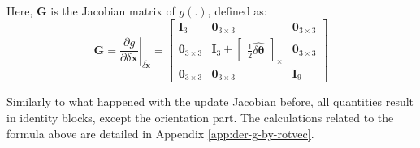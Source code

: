 Here, $\mathbf{G}$ is the Jacobian matrix of $g(.)$, defined as:
\begin{equation}
    \mathbf{G}=\left.\frac{\partial g}{\partial\delta\mathbf{x}}\right\vert_{\hat{\delta\mathbf{x}}}=\begin{bmatrix}
        \mathbf{I}_3 & \mathbf{0}_{3\times 3} & \mathbf{0}_{3\times 3} \\
        \mathbf{0}_{3\times 3} & \mathbf{I}_3+\begin{bmatrix}
            \frac{1}{2}\hat{\delta\boldsymbol{\theta}}
        \end{bmatrix}_\times & \mathbf{0}_{3\times 3} \\
        \mathbf{0}_{3\times 3} & \mathbf{0}_{3\times 3} & \mathbf{I}_9
    \end{bmatrix}
\end{equation}

Similarly to what happened with the update Jacobian before, all quantities result in identity blocks, except the orientation part. The calculations related to the formula above are detailed in Appendix \ref{app:der-g-by-rotvec}.